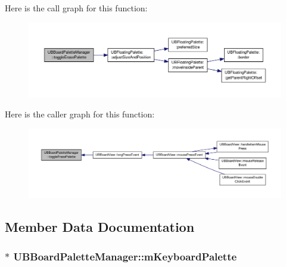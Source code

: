 Here is the call graph for this function\-:
\nopagebreak
\begin{figure}[H]
\begin{center}
\leavevmode
\includegraphics[width=350pt]{dc/d38/class_u_b_board_palette_manager_a118cccd08976f403b2bf6a10a07f01d7_cgraph}
\end{center}
\end{figure}




Here is the caller graph for this function\-:
\nopagebreak
\begin{figure}[H]
\begin{center}
\leavevmode
\includegraphics[width=350pt]{dc/d38/class_u_b_board_palette_manager_a118cccd08976f403b2bf6a10a07f01d7_icgraph}
\end{center}
\end{figure}




\subsection{Member Data Documentation}
\hypertarget{class_u_b_board_palette_manager_a01a14c9ae374265868a703f63770b5df}{
\subsubsection[{m\-Keyboard\-Palette}]{$\ast$ U\-B\-Board\-Palette\-Manager\-::m\-Keyboard\-Palette}}\label{dc/d38/class_u_b_board_palette_manager_a01a14c9ae374265868a703f63770b5df}


